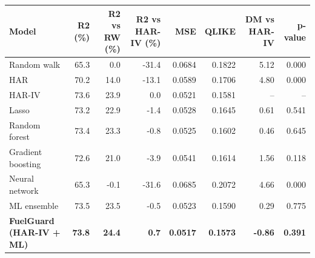 \begin{tabular}{lrrrrrrr}
\toprule
Model & R2 (\%) & R2 vs RW (\%) & R2 vs HAR-IV (\%) & MSE & QLIKE & DM vs HAR-IV & p-value \\
\midrule
Random walk & 65.3 & 0.0 & -31.4 & 0.0684 & 0.1822 & 5.12 & 0.000 \\
HAR & 70.2 & 14.0 & -13.1 & 0.0589 & 0.1706 & 4.80 & 0.000 \\
HAR-IV & 73.6 & 23.9 & 0.0 & 0.0521 & 0.1581 & -- & -- \\
Lasso & 73.2 & 22.9 & -1.4 & 0.0528 & 0.1645 & 0.61 & 0.541 \\
Random forest & 73.4 & 23.3 & -0.8 & 0.0525 & 0.1602 & 0.46 & 0.645 \\
Gradient boosting & 72.6 & 21.0 & -3.9 & 0.0541 & 0.1614 & 1.56 & 0.118 \\
Neural network & 65.3 & -0.1 & -31.6 & 0.0685 & 0.2072 & 4.66 & 0.000 \\
ML ensemble & 73.5 & 23.5 & -0.5 & 0.0523 & 0.1590 & 0.29 & 0.775 \\
\textbf{FuelGuard (HAR-IV + ML)} & \textbf{73.8} & \textbf{24.4} & \textbf{0.7} & \textbf{0.0517} & \textbf{0.1573} & \textbf{-0.86} & \textbf{0.391} \\
\bottomrule
\end{tabular}
